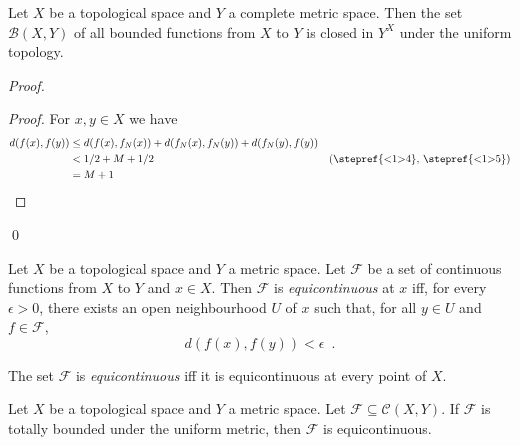 \begin{thm}
  \label{thm:topology:metric:bounded_closed}
  Let $X$ be a topological space and $Y$ a complete metric space. Then the set $\mathcal{B}(X, Y)$ of all bounded functions from $X$ to $Y$ is closed in $Y^X$ under the uniform topology.
\end{thm}

\begin{proof}
  \pf
  \begin{proof}
    \pf
    For $x, y \in X$ we have
    \begin{align*}
      d(f(x), f(y)) & \leq d(f(x), f_N(x)) + d(f_N(x), f_N(y)) + d(f_N(y), f(y)) \\
      & < 1/2 + M + 1/2 & (\text{\stepref{<1>4}, \stepref{<1>5}})\\
      & = M + 1
    \end{align*}
  \end{proof}
  \qed
\end{proof}

\begin{df}[Equicontinuous]
  Let $X$ be a topological space and $Y$ a metric space. Let $\mathcal{F}$ be a set of continuous functions from $X$ to $Y$ and $x \in X$. Then $\mathcal{F}$ is \emph{equicontinuous} at $x$ iff, for every $\epsilon > 0$, there exists an open neighbourhood $U$ of $x$ such that, for all $y \in U$ and $f \in \mathcal{F}$,
  \[ d(f(x), f(y)) < \epsilon \enspace . \]

  The set $\mathcal{F}$ is \emph{equicontinuous} iff it is equicontinuous at every point of $X$.
\end{df}

\begin{lm}
  \label{metric:totally_bounded_equicontinuous}
  Let $X$ be a topological space and $Y$ a metric space. Let $\mathcal{F} \subseteq \mathcal{C}(X, Y)$. If $\mathcal{F}$ is totally bounded under the uniform metric, then $\mathcal{F}$ is equicontinuous.
\end{lm}


